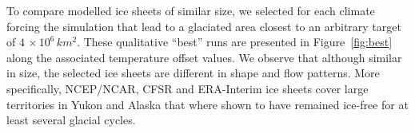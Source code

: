 To compare modelled ice sheets of similar size, we selected for each climate forcing the simulation that lead to a glaciated area closest to an arbitrary target of $4\,\times10^6\,\unit{km^2}$. These qualitative ``best'' runs are presented in Figure~\ref{fig:best} along the associated temperature offset values. We observe that although similar in size, the selected ice sheets are different in shape and flow patterns. More specifically, NCEP/NCAR, CFSR and ERA-Interim ice sheets cover large territories in Yukon and Alaska that where shown to have remained ice-free for at least several glacial cycles.\needref

